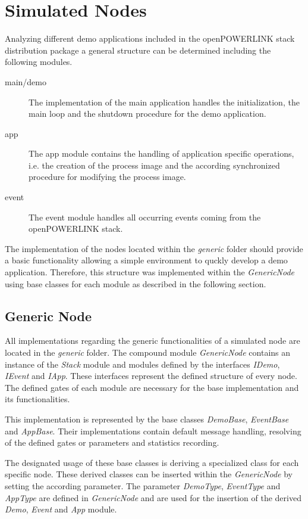 \section{Simulated Nodes}
\label{sec:porting_nodes}
Analyzing different demo applications included in the openPOWERLINK stack distribution package a general structure can be determined including the following modules.

\begin{description}
    \item[main/demo] The implementation of the main application handles the initialization, the main loop and the shutdown procedure for the demo application.
    \item[app] The app module contains the handling of application specific operations, i.e. the creation of the process image and the according synchronized procedure for modifying the process image.
    \item[event] The event module handles all occurring events coming from the openPOWERLINK stack.
\end{description}

The implementation of the nodes located within the \emph{generic} folder should provide a basic functionality allowing a simple environment to quckly develop a demo application.
Therefore, this structure was implemented within the \emph{GenericNode} using base classes for each module as described in the following section.

\subsection{Generic Node}
\label{sec:porting_nodes_generic}
All implementations regarding the generic functionalities of a simulated node are located in the \emph{generic} folder.
The compound module \emph{GenericNode} contains an instance of the \emph{Stack} module and modules defined by the interfaces \emph{IDemo}, \emph{IEvent} and \emph{IApp}.
These interfaces represent the defined structure of every node.
The defined gates of each module are necessary for the base implementation and its functionalities.

This implementation is represented by the base classes \emph{DemoBase}, \emph{EventBase} and \emph{AppBase}.
Their implementations contain default message handling, resolving of the defined gates or parameters and statistics recording.

The designated usage of these base classes is deriving a specialized class for each specific node.
These derived classes can be inserted within the \emph{GenericNode} by setting the according parameter.
The parameter \emph{DemoType}, \emph{EventType} and \emph{AppType} are defined in \emph{GenericNode} and are used for the insertion of the derived \emph{Demo}, \emph{Event} and \emph{App} module.

